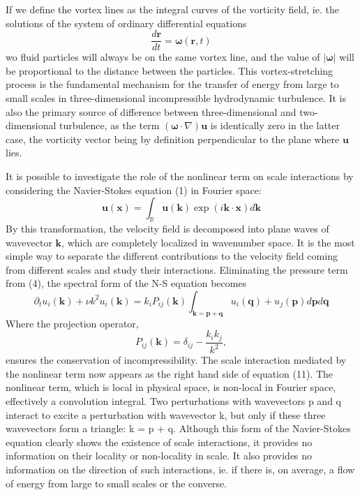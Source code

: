 If we define the vortex lines as the integral curves of the vorticity field,
ie. the solutions of the system of ordinary differential equations
\begin{equation}
    \frac{d\mathbf{r}}{dt}=\boldsymbol{\omega}(\mathbf{r},t)
\end{equation}
wo fluid particles will always be on the same vortex line, and the value of $|\boldsymbol{\omega}|$ will be proportional to the distance between the particles.
This vortex-stretching process is the fundamental mechanism for the transfer of energy from large to small scales in three-dimensional incompressible hydrodynamic turbulence. It is also the primary source of difference between three-dimensional and two-dimensional turbulence, as the term $(\boldsymbol{\omega}\cdot\nabla)\mathbf{u}$ is identically zero in the latter case, the vorticity vector being by definition perpendicular to the plane where $\mathbf{u}$ lies.

It is possible to investigate the role of the nonlinear term on scale interactions by considering the Navier-Stokes equation (1) in Fourier space:
\begin{equation}
    \mathbf{u}(\mathbf{x})=\int_\mathbb{R}\mathbf{u}(\mathbf{k})\exp(i\mathbf{k}\cdot\mathbf{x})d\mathbf{k}
\end{equation}
By this transformation, the velocity field is decomposed into plane waves of wavevector $\mathbf{k}$, which are completely localized in wavenumber space. It is the most simple way to separate the different contributions to
the velocity field coming from different scales and study their interactions.
Eliminating the pressure term from (4), the spectral form of the N-S equation becomes 
\begin{equation}
    \partial_tu_i(\mathbf{k})+\nu k^2u_i(\mathbf{k})=k_iP_{ij}(\mathbf{k})\int_{\mathbf{k}=\mathbf{p}+\mathbf{q}}u_i(\mathbf{q})+u_j(\mathbf{p})d\mathbf{p}d\mathbf{q}
\end{equation}
Where the projection operator,
\begin{equation}
    P_{ij}(\mathbf{k})=\delta_{ij}-\frac{k_ik_j}{k^2},
\end{equation}
ensures the conservation of incompressibility. 
The scale interaction mediated by the nonlinear term now appears as the right hand side of equation (11). The nonlinear term, which is local in physical space, is non-local in Fourier space, effectively a convolution integral. Two perturbations with wavevectors p and q interact to excite a perturbation with wavevector k, but only if these three wavevectors form a triangle: k = p + q. Although this form of the Navier-Stokes equation clearly shows the existence of scale interactions, it provides no information on their locality or non-locality in scale. It also provides no information on the direction of such interactions, ie. if there is, on average, a flow of energy from large to small scales or the converse.

